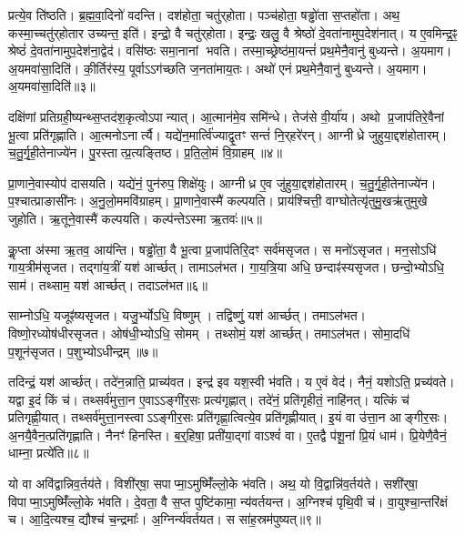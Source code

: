 प्रत्ये॒व ति॑ष्ठति।
ब्र॒ह्म॒वा॒दिनो॑ वदन्ति।
दश॑होता॒ चतु॑र्‌\mbox{}होता।
पञ्च॑होता॒ षड्ढो॑ता स॒प्तहो॑ता।
अथ॒ कस्मा॒च्चतु॑र्‌\mbox{}होतार उच्यन्त॒ इति॑।
इन्द्रो॒ वै चतु॑र्‌\mbox{}होता।
इन्द्रः॒ खलु॒ वै श्रेष्ठो॑ दे॒वता॑नामुप॒\-देश॑नात्।
य ए॒वमिन्द्र॒ꣴ॒ श्रेष्ठं॑ दे॒वता॑नामुप॒\-देश॑ना॒द्वेद॑।
वसि॑ष्ठः समा॒नानां भवति।
तस्मा॒च्छ्रेष्ठ॑मा॒यन्तं॑ प्रथ॒मेनै॒वानु॑ बुध्यन्ते।
अ॒यमाग\sn{}।
अ॒यमवा॑सा॒दिति॑।
की॒र्तिर॑स्य॒ पूर्वा\-ऽऽग॑च्छति ज॒नता॑माय॒तः।
अथो॑ एनं प्रथ॒मेनै॒वानु॑ बुध्यन्ते।
अ॒यमाग\sn{}।
अ॒यमवा॑सा॒दिति॑॥३॥\anuvakamend[स॒प्तहो॑ता प्रति॒ष्ठां वेद॑ बुध्यन्ते॒ षट्च॑]

दक्षि॑णां प्रतिग्रही॒ष्यन्थ्स॒प्तद॑श॒कृत्वो\-ऽपान्यात्।
आ॒त्मान॑मे॒व समि॑न्धे।
तेज॑से वी॒र्या॑य।
अथो प्र॒जाप॑तिरे॒वैनां भू॒त्वा प्रति॑\-गृह्णाति।
आ॒त्मनो\-ऽनार्त्यै।
यद्ये॑न॒मार्त्वि॑ज्याद्वृ॒तꣳ सन्तं॑ नि॒र्‌\mbox{}हरे॑रन्।
आग्नीध्रे जुहुया॒द्दश॑होतारम्।
च॒तु॒र्गृ॒ही॒तेनाज्ये॑न।
पु॒रस्तात्प्र॒त्यङ्तिष्ठ\sn{}।
प्र॒ति॒लो॒मं वि॒ग्राहम्॥४॥

प्रा॒णाने॒वास्योप॑ दासयति।
यद्ये॑नं॒ पुन॑रुप॒ शिक्षे॑युः।
आग्नीध्र ए॒व जु॑हुया॒द्दश॑होतारम्।
च॒तु॒र्गृ॒ही॒तेनाज्ये॑न।
प॒श्चात्प्राङासी॑नः।
अ॒नु॒लो॒ममवि॑ग्राहम्।
प्रा॒णाने॒वास्मै॑ कल्पयति।
प्राय॑श्चित्ती॒ वाग्घोतेत्यृ॑तुमु॒खऋ॑तुमुखे जुहोति।
ऋ॒तूने॒वास्मै॑ कल्पयति।
कल्प॑न्ते\-ऽस्मा ऋ॒तवः॑॥५॥

कॢ॒प्ता अ॑स्मा ऋ॒तव॒ आय॑न्ति।
षड्ढो॑ता॒ वै भू॒त्वा प्र॒जाप॑तिरि॒दꣳ सर्व॑मसृजत।
स मनो॑\-ऽसृजत।
मन॒सोऽधि॑ गाय॒त्रीम॑सृजत।
तद्गा॑य॒त्रीं यश॑ आर्च्छत्।
तामाऽल॑भत।
गा॒य॒त्रि॒या अधि॒ छन्दाꣴ॑स्यसृजत।
छन्दो॒भ्योऽधि॒ साम॑।
तथ्साम॒ यश॑ आर्च्छत्।
तदाऽल॑भत॥६॥

साम्नोऽधि॒ यजूꣴ॑ष्यसृजत।
यजु॒र्भ्योऽधि॒ विष्णुम्।
तद्विष्णुं॒ यश॑ आर्च्छत्।
तमाऽल॑भत।
विष्णो॒रध्योष॑धीरसृजत।
ओष॑धी॒भ्योऽधि॒ सोमम्।
तथ्सोमं॒ यश॑ आर्च्छत्।
तमाऽल॑भत।
सोमा॒दधि॑ प॒शून॑सृजत।
प॒शुभ्यो\-ऽधीन्द्रम्॥७॥

तदिन्द्रं॒ यश॑ आर्च्छत्।
तदे॑न॒न्नाति॒ प्राच्य॑वत।
इन्द्र॑ इव यश॒स्वी भ॑वति।
य ए॒वं वेद॑।
नैनं॒ यशोऽति॒ प्रच्य॑वते।
यद्वा इ॒दं किं च॑।
तथ्सर्व॑मुत्ता॒न ए॒वा\-ऽऽङ्गी॑र॒सः प्रत्य॑गृह्णात्।
तदे॑नं॒ प्रति॑\-गृहीतं॒ नाहि॑नत्।
यत्किं च॑ प्रतिगृह्णी॒यात्।
तथ्सर्व॑मुत्ता॒नस्त्वा\-ऽऽङ्गीर॒सः प्रति॑\-गृह्णा॒त्वित्ये॒व प्रति॑\-गृह्णीयात्।
इ॒यं वा उ॑त्ता॒न आङ्गीर॒सः।
अ॒नयै॒वैन॒त्प्रति॑\-गृह्णाति।
नैनꣳ॑ हिनस्ति।
ब॒र्॒हिषा॒ प्रती॑या॒द्गां वाऽश्वं॑ वा।
ए॒तद्वै प॑शू॒नां प्रि॒यं धाम॑।
प्रि॒येणै॒वैनं॒ धाम्ना॒ प्रत्ये॑ति॥८॥\anuvakamend[वि॒ग्राह॑मृ॒तव॒स्तदा\-ऽल॑भ॒तेन्द्रं॑ गृह्णीया॒थ्षट्च॑]

यो वा अवि॑द्वान्निव॒र्तय॑ते।
विशी॑र्‌\mbox{}षा॒ सपाप्मा॒\-ऽमुष्मिँ॑ल्लो॒के भ॑वति।
अथ॒ यो वि॒द्वान्नि॑व॒र्तय॑ते।
सशी॑र्‌\mbox{}षा॒ विपाप्मा॒\-ऽमुष्मिँ॑ल्लो॒के भ॑वति।
दे॒वता॒ वै स॒प्त पुष्टि॑कामा॒ न्य॑वर्तयन्त।
अ॒ग्निश्च॑ पृथि॒वी च॑।
वा॒युश्चा॒न्तरि॑क्षं च।
आ॒दि॒त्यश्च॒ द्यौश्च॑ च॒न्द्रमाः᳚।
अ॒ग्निर्न्य॑वर्तयत।
स सा॑ह॒स्रम॑पुष्यत्॥९॥

